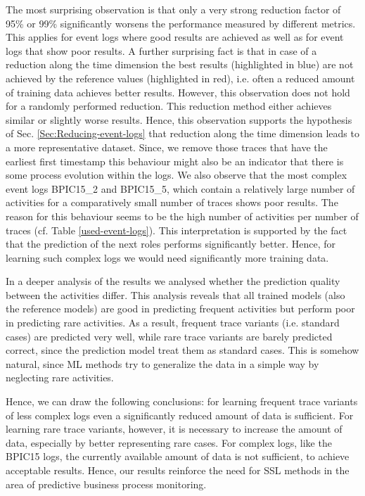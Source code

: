 \documentclass[runningheads]{llncs}
\begin{document}
The most surprising observation is that only a very strong reduction factor of 95\% or 99\% significantly worsens the performance measured by different metrics. This applies for event logs where good results are achieved as well as for event logs that show poor results. A further surprising fact is that in case of a reduction along the time dimension the best results (highlighted in blue) are not achieved by the reference values (highlighted in red), i.e. often a reduced amount of training data achieves better results. However, this observation does not hold for a randomly performed reduction. This reduction method either achieves similar or slightly worse results. Hence, this observation supports the hypothesis of Sec. \ref{Sec:Reducing-event-logs} that reduction along the time dimension leads to a more representative dataset. Since, we remove those traces that have the earliest first timestamp this behaviour might also be an indicator that there is some process evolution within the logs. We also observe that the most complex event logs BPIC15\_2 and BPIC15\_5, which contain a relatively large number of activities for a comparatively small number of traces shows poor results. The reason for this behaviour seems to be the high number of activities per number of traces (cf. Table \ref{used-event-logs}). This interpretation is supported by the fact that the prediction of the next roles performs significantly better. Hence, for learning such complex logs we would need significantly more training data.

In a deeper analysis of the results we analysed whether the prediction quality between the activities differ. This analysis reveals that all trained models (also the reference models) are good in predicting frequent activities but perform poor in predicting rare activities. As a result, frequent trace variants (i.e. standard cases) are predicted very well, while rare trace variants are barely predicted correct, since the prediction model treat them as standard cases. This is somehow natural, since ML methods try to generalize the data in a simple way by neglecting rare activities. 

Hence, we can draw the following conclusions: for learning frequent trace variants of less complex logs even a significantly reduced amount of data is sufficient. For learning rare trace variants, however, it is necessary to increase the amount of data, especially by better representing rare cases. For complex logs, like the BPIC15 logs, the currently available amount of data is not sufficient, to achieve acceptable results. Hence, our results reinforce the need for SSL methods in the area of predictive business process monitoring.
\end{document}
